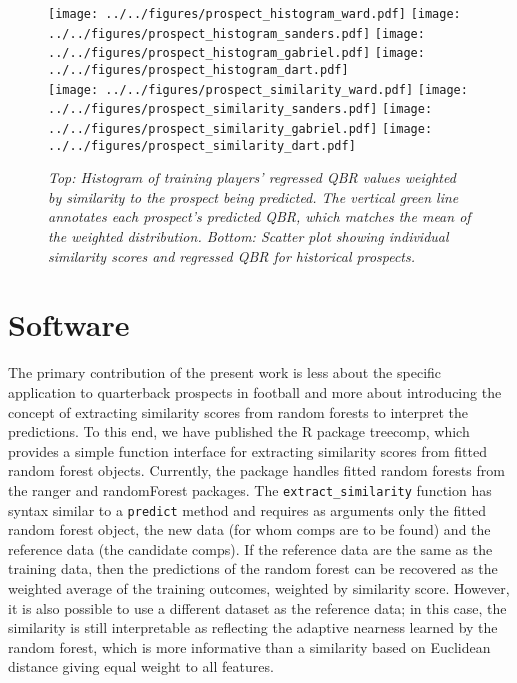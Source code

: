 \documentclass{article}
\begin{document}
\begin{figure}[h]
    \centering
    \texttt{[image: ../../figures/prospect\_histogram\_ward.pdf]}
    \texttt{[image: ../../figures/prospect\_histogram\_sanders.pdf]}
    \texttt{[image: ../../figures/prospect\_histogram\_gabriel.pdf]}
    \texttt{[image: ../../figures/prospect\_histogram\_dart.pdf]} \\
    \texttt{[image: ../../figures/prospect\_similarity\_ward.pdf]}
    \texttt{[image: ../../figures/prospect\_similarity\_sanders.pdf]}
    \texttt{[image: ../../figures/prospect\_similarity\_gabriel.pdf]}
    \texttt{[image: ../../figures/prospect\_similarity\_dart.pdf]}
    \caption{\it Top: Histogram of training players' regressed QBR values weighted by similarity to the prospect being predicted. The vertical green line annotates each prospect's predicted QBR, which matches the mean of the weighted distribution. Bottom: Scatter plot showing individual similarity scores and regressed QBR for historical prospects.}
    \label{fig:prospect-plots}
\end{figure}

\section{Software}
\label{sec:software}

The primary contribution of the present work is less about the specific application to quarterback prospects in football and more about introducing the concept of extracting similarity scores from random forests to interpret the predictions. To this end, we have published the R package treecomp, which provides a simple function interface for extracting similarity scores from fitted random forest objects. Currently, the package handles fitted random forests from the ranger and randomForest packages. The \texttt{extract\_similarity} function has syntax similar to a \texttt{predict} method and requires as arguments only the fitted random forest object, the new data (for whom comps are to be found) and the reference data (the candidate comps). If the reference data are the same as the training data, then the predictions of the random forest can be recovered as the weighted average of the training outcomes, weighted by similarity score. However, it is also possible to use a different dataset as the reference data; in this case, the similarity is still interpretable as reflecting the adaptive nearness learned by the random forest, which is more informative than a similarity based on Euclidean distance giving equal weight to all features.
\end{document}
